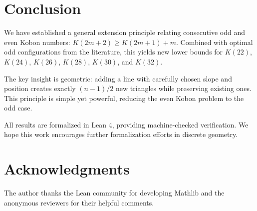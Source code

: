 \documentclass[11pt,a4paper]{article}
\theoremstyle{plain}
\theoremstyle{definition}
\theoremstyle{remark}
\newcommand{\K}{K}
\begin{document}
\section{Conclusion}

We have established a general extension principle relating consecutive odd and even Kobon numbers: $\K(2m+2) \geq \K(2m+1) + m$. Combined with optimal odd configurations from the literature, this yields new lower bounds for $\K(22)$, $\K(24)$, $\K(26)$, $\K(28)$, $\K(30)$, and $\K(32)$.

The key insight is geometric: adding a line with carefully chosen slope and position creates exactly $(n-1)/2$ new triangles while preserving existing ones. This principle is simple yet powerful, reducing the even Kobon problem to the odd case.

All results are formalized in Lean 4, providing machine-checked verification. We hope this work encourages further formalization efforts in discrete geometry.

\section*{Acknowledgments}

The author thanks the Lean community for developing Mathlib and the anonymous reviewers for their helpful comments.
\end{document}
